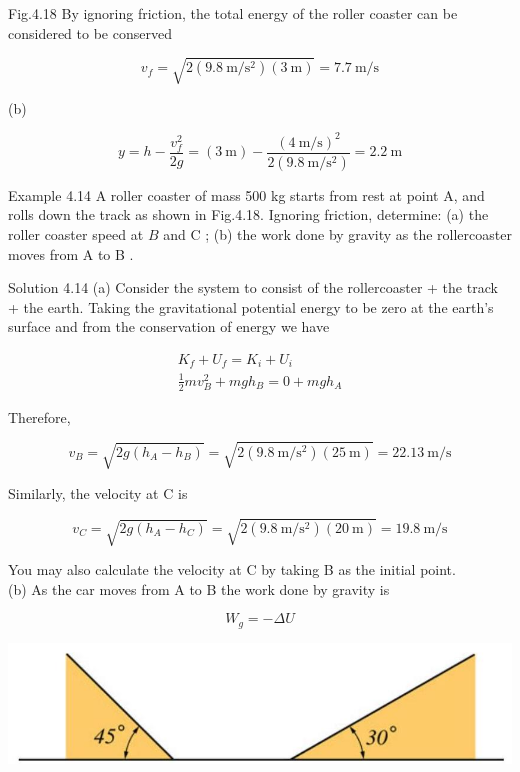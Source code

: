 \documentclass[10pt]{article}
\begin{document}
Fig.4.18 By ignoring friction, the total energy of the roller coaster can be considered to be conserved

$$
v_{f}=\sqrt{2\left(9.8 \mathrm{~m} / \mathrm{s}^{2}\right)(3 \mathrm{~m})}=7.7 \mathrm{~m} / \mathrm{s}
$$

(b)

$$
y=h-\frac{v_{f}^{2}}{2 g}=(3 \mathrm{~m})-\frac{(4 \mathrm{~m} / \mathrm{s})^{2}}{2\left(9.8 \mathrm{~m} / \mathrm{s}^{2}\right)}=2.2 \mathrm{~m}
$$

Example 4.14 A roller coaster of mass 500 kg starts from rest at point A, and rolls down the track as shown in Fig.4.18. Ignoring friction, determine: (a) the roller coaster speed at $B$ and C ; (b) the work done by gravity as the rollercoaster moves from A to B .

Solution 4.14 (a) Consider the system to consist of the rollercoaster + the track + the earth. Taking the gravitational potential energy to be zero at the earth's surface and from the conservation of energy we have

$$
\begin{gathered}
K_{f}+U_{f}=K_{i}+U_{i} \\
\frac{1}{2} m v_{B}^{2}+m g h_{B}=0+m g h_{A}
\end{gathered}
$$

Therefore,

$$
v_{B}=\sqrt{2 g\left(h_{A}-h_{B}\right)}=\sqrt{2\left(9.8 \mathrm{~m} / \mathrm{s}^{2}\right)(25 \mathrm{~m})}=22.13 \mathrm{~m} / \mathrm{s}
$$

Similarly, the velocity at C is

$$
v_{C}=\sqrt{2 g\left(h_{A}-h_{C}\right)}=\sqrt{2\left(9.8 \mathrm{~m} / \mathrm{s}^{2}\right)(20 \mathrm{~m})}=19.8 \mathrm{~m} / \mathrm{s}
$$

You may also calculate the velocity at C by taking B as the initial point.\\
(b) As the car moves from A to B the work done by gravity is

$$
W_{g}=-\Delta U
$$

\begin{center}
\includegraphics[max width=\textwidth]{2024_09_13_db1f357d2aad0a03eb2eg-073}
\end{center}
\end{document}

